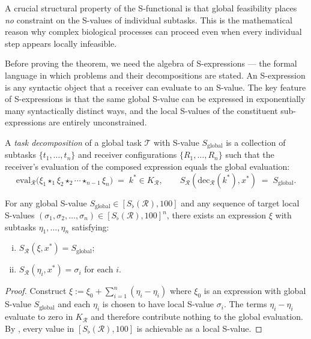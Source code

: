A crucial structural property of the S-functional is that global feasibility
places \emph{no} constraint on the S-values of individual subtasks.  This
is the mathematical reason why complex biological processes can proceed even
when every individual step appears locally infeasible.

Before proving the theorem, we need the algebra of S-expressions — the formal
language in which problems and their decompositions are stated.  An
S-expression is any syntactic object that a receiver can evaluate to an
S-value.  The key feature of S-expressions is that the same global S-value
can be expressed in exponentially many syntactically distinct ways, and the
local S-values of the constituent sub-expressions are entirely unconstrained.

\begin{definition}
\label{def:task-decomposition}
A \emph{task decomposition} of a global task $\mathcal{T}$ with S-value
$S_{\mathrm{global}}$ is a collection of subtasks $\{t_1, \ldots, t_n\}$ and
receiver configurations $\{R_1, \ldots, R_n\}$ such that the receiver's
evaluation of the composed expression equals the global evaluation:
\[
  \mathrm{eval}_{\mathcal{R}}\!\bigl(\xi_1 \star_1 \xi_2 \star_2 \cdots
  \star_{n-1} \xi_n\bigr) \;=\; k^* \in K_{\mathcal{R}} ,
  \qquad
  S_{\mathcal{R}}(\mathrm{dec}_{\mathcal{R}}(k^*), x^*) \;=\; S_{\mathrm{global}} .
\]
\end{definition}

\begin{theorem}
\label{thm:local-global}
For any global S-value $S_{\mathrm{global}} \in [S_\flat(\mathcal{R}), 100]$
and any sequence of target local S-values
$(\sigma_1, \sigma_2, \ldots, \sigma_n) \in [S_\flat(\mathcal{R}), 100]^n$,
there exists an expression $\xi$ with subtasks $\eta_1, \ldots, \eta_n$
satisfying:
\begin{enumerate}[(i)]
  \item $S_{\mathcal{R}}(\xi, x^*) = S_{\mathrm{global}}$;
  \item $S_{\mathcal{R}}(\eta_i, x^*) = \sigma_i$ for each $i$.
\end{enumerate}
\end{theorem}

\begin{proof}
Construct $\xi := \xi_0 + \sum_{i=1}^n (\eta_i - \eta_i)$ where $\xi_0$ is
an expression with global S-value $S_{\mathrm{global}}$ and each $\eta_i$ is
chosen to have local S-value $\sigma_i$.  The terms $\eta_i - \eta_i$
evaluate to zero in $K_{\mathcal{R}}$ and therefore contribute nothing to the
global evaluation.  By , every value in
$[S_\flat(\mathcal{R}), 100]$ is achievable as a local S-value.
\end{proof}

